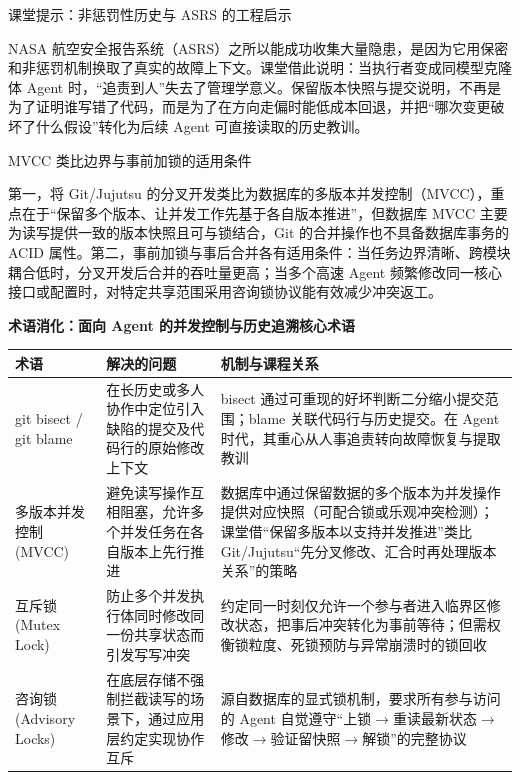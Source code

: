 \documentclass[UTF8,a4paper,11pt,fontset=fandol]{ctexart}
\begin{document}
\begin{knowledgebox}{课堂提示：非惩罚性历史与 ASRS 的工程启示}

NASA 航空安全报告系统（ASRS）之所以能成功收集大量隐患，是因为它用保密和非惩罚机制换取了真实的故障上下文。课堂借此说明：当执行者变成同模型克隆体 Agent 时，“追责到人”失去了管理学意义。保留版本快照与提交说明，不再是为了证明谁写错了代码，而是为了在方向走偏时能低成本回退，并把“哪次变更破坏了什么假设”转化为后续 Agent 可直接读取的历史教训。

\end{knowledgebox}

\begin{warningbox}{MVCC 类比边界与事前加锁的适用条件}

第一，将 Git/Jujutsu 的分叉开发类比为数据库的多版本并发控制（MVCC），重点在于“保留多个版本、让并发工作先基于各自版本推进”，但数据库 MVCC 主要为读写提供一致的版本快照且可与锁结合，Git 的合并操作也不具备数据库事务的 ACID 属性。第二，事前加锁与事后合并各有适用条件：当任务边界清晰、跨模块耦合低时，分叉开发后合并的吞吐量更高；当多个高速 Agent 频繁修改同一核心接口或配置时，对特定共享范围采用咨询锁协议能有效减少冲突返工。

\end{warningbox}

\par{}\textbf{术语消化：面向 Agent 的并发控制与历史追溯核心术语}

\begin{center}\small\begin{tabularx}{\linewidth}{YYY}

\toprule

术语 & 解决的问题 & 机制与课程关系\\\midrule

git bisect / git blame & 在长历史或多人协作中定位引入缺陷的提交及代码行的原始修改上下文 & bisect 通过可重现的好坏判断二分缩小提交范围；blame 关联代码行与历史提交。在 Agent 时代，其重心从人事追责转向故障恢复与提取教训\\[3pt]

多版本并发控制 (MVCC) & 避免读写操作互相阻塞，允许多个并发任务在各自版本上先行推进 & 数据库中通过保留数据的多个版本为并发操作提供对应快照（可配合锁或乐观冲突检测）；课堂借“保留多版本以支持并发推进”类比 Git/Jujutsu“先分叉修改、汇合时再处理版本关系”的策略\\[3pt]

互斥锁 (Mutex Lock) & 防止多个并发执行体同时修改同一份共享状态而引发写写冲突 & 约定同一时刻仅允许一个参与者进入临界区修改状态，把事后冲突转化为事前等待；但需权衡锁粒度、死锁预防与异常崩溃时的锁回收\\[3pt]

咨询锁 (Advisory Locks) & 在底层存储不强制拦截读写的场景下，通过应用层约定实现协作互斥 & 源自数据库的显式锁机制，要求所有参与访问的 Agent 自觉遵守“上锁\ensuremath{\rightarrow}重读最新状态\ensuremath{\rightarrow}修改\ensuremath{\rightarrow}验证留快照\ensuremath{\rightarrow}解锁”的完整协议\\[3pt]

\bottomrule\end{tabularx}\end{center}
\end{document}
